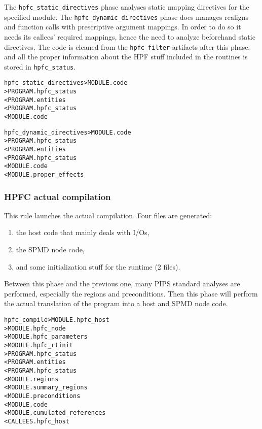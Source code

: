 \documentclass[a4paper]{report}
\newenvironment{PipsMake}{\begin{alltt}}{\end{alltt}}
\begin{document}
The \verb|hpfc_static_directives| phase analyses static mapping directives
for the specified module. The \verb|hpfc_dynamic_directives| phase does
manages realigns and function calls with prescriptive argument
mappings. In order to do so it needs its callees' required mappings, hence
the need to analyze beforehand static directives. The code is cleaned from
the \verb|hpfc_filter| artifacts after this phase, and all the proper
information about the HPF stuff included in the routines is stored in
\verb|hpfc_status|.

\begin{PipsMake}
hpfc_static_directives         > MODULE.code
                        > PROGRAM.hpfc_status
    < PROGRAM.entities
    < PROGRAM.hpfc_status
    < MODULE.code

hpfc_dynamic_directives         > MODULE.code
                        > PROGRAM.hpfc_status
    < PROGRAM.entities
    < PROGRAM.hpfc_status
    < MODULE.code
    < MODULE.proper_effects
\end{PipsMake}

\subsubsection{HPFC actual compilation}

This rule launches the actual compilation. Four files are generated:

\begin{enumerate}
\item  the host code that mainly deals with I/Os,
\item the SPMD node code,
\item and some initialization stuff for the runtime (2 files).
\end{enumerate}

Between this phase and the previous
one, many PIPS standard analyses are performed, especially the regions and
preconditions.  Then this phase will perform the actual translation of the
program into a host and SPMD node code.

\begin{PipsMake}
hpfc_compile           > MODULE.hpfc_host
                       > MODULE.hpfc_node
                       > MODULE.hpfc_parameters
                       > MODULE.hpfc_rtinit
                       > PROGRAM.hpfc_status
    < PROGRAM.entities
    < PROGRAM.hpfc_status
    < MODULE.regions
    < MODULE.summary_regions
    < MODULE.preconditions
    < MODULE.code
    < MODULE.cumulated_references
    < CALLEES.hpfc_host
\end{PipsMake}
\end{document}
